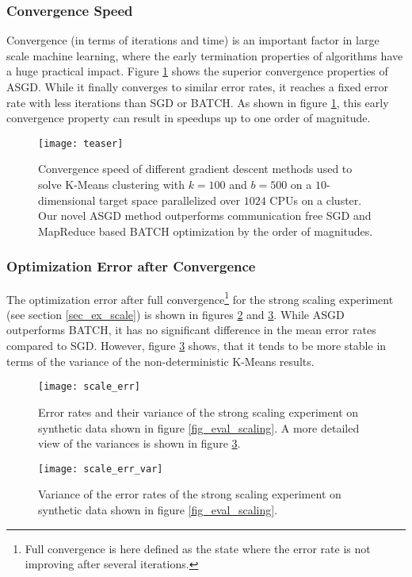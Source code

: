 \documentclass{acm_proc_article-sp}
\begin{document}
\subsubsection*{Convergence Speed\label{sec_ex_con}}
Convergence (in terms of iterations and time) is an important factor in large 
scale machine learning, where the early termination properties of algorithms 
have a huge practical impact. Figure \ref{fig_eval_conv} shows the superior 
convergence properties of ASGD. While it finally converges to similar error 
rates, it reaches a fixed error rate with less iterations than SGD or BATCH.
As shown in figure \ref{fig_eval_conv}, this early convergence property
can result in speedups up to one order of magnitude.      
\begin{figure}[!ht]
\texttt{[image: teaser]}
\caption{Convergence speed of different gradient descent methods used to solve
K-Means clustering
with $k=100$ and $b=500$ on a $10$-dimensional target space parallelized  over $1024$ CPUs
on a cluster. Our novel ASGD method outperforms communication free SGD
\cite{SGDsmola} and
MapReduce
based BATCH \cite{chu2007map} optimization by the order of magnitudes.
\label{fig_eval_conv}
}
\end{figure}
\newpage
\subsubsection*{Optimization Error after Convergence\label{sec_ex_err}} 
The optimization error after full convergence\footnote{Full convergence is 
here defined as the state where the error rate is not improving after 
several iterations.} for the strong scaling experiment (see section \ref{sec_ex_scale})
is shown in figures \ref{fig_scale_err} and \ref{fig_scale_var}. While ASGD 
outperforms BATCH, it has no significant difference in the mean error rates
compared to SGD. However, figure \ref{fig_scale_var} shows, that it 
tends to be more stable in terms of the variance of the non-deterministic
K-Means results.  
\begin{figure}[!ht]
\texttt{[image: scale\_err]}
\caption{Error rates and their variance of the strong scaling experiment 
on synthetic data shown in figure \ref{fig_eval_scaling}. A more detailed 
view of the variances is shown in figure \ref{fig_scale_var}.
\label{fig_scale_err}}
\end{figure}

\begin{figure}[!ht]
\texttt{[image: scale\_err\_var]}
\caption{Variance of the error rates of the strong scaling experiment 
on synthetic data shown in figure \ref{fig_eval_scaling}.
\label{fig_scale_var}}
\end{figure}
\end{document}
